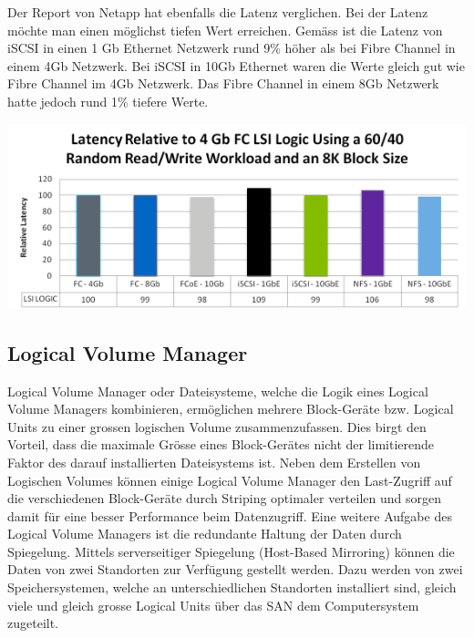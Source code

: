 Der Report von Netapp hat ebenfalls die Latenz verglichen. Bei der Latenz möchte man einen möglichst tiefen Wert erreichen. Gemäss  ist die Latenz von iSCSI in einen 1 Gb Ethernet Netzwerk rund 9\% höher als bei Fibre Channel in einem 4Gb Netzwerk. Bei iSCSI in 10Gb Ethernet waren die Werte gleich gut wie Fibre Channel im 4Gb Netzwerk. Das Fibre Channel in einem 8Gb Netzwerk hatte jedoch rund 1\% tiefere Werte. \cite{Jafri2011}

\begin{center}
\includegraphics[width=\linewidth, keepaspectratio = true]{media/netapp_latence.png}
\end{center}
 
\subsection{Logical Volume Manager}
Logical Volume Manager oder Dateisysteme, welche die Logik eines Logical Volume Managers kombinieren, ermöglichen mehrere Block-Geräte bzw. Logical Units zu einer grossen logischen Volume zusammenzufassen. Dies birgt den Vorteil, dass die maximale Grösse eines Block-Gerätes nicht der limitierende Faktor des darauf installierten Dateisystems ist. Neben dem Erstellen von Logischen Volumes können einige Logical Volume Manager den Last-Zugriff auf die verschiedenen Block-Geräte durch Striping optimaler verteilen und sorgen damit für eine besser Performance beim Datenzugriff. Eine weitere Aufgabe des Logical Volume Managers ist die redundante Haltung der Daten durch Spiegelung. Mittels serverseitiger Spiegelung (Host-Based Mirroring) können die Daten von zwei Standorten zur Verfügung gestellt werden. Dazu werden von zwei Speichersystemen, welche an unterschiedlichen Standorten installiert sind, gleich viele und gleich grosse Logical Units über das SAN dem Computersystem zugeteilt.


